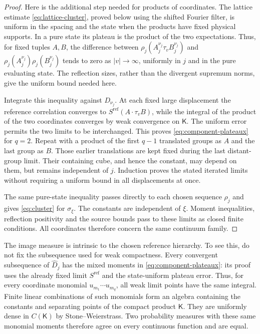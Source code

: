 \documentclass[11pt,letterpaper,reqno]{amsart}
\theoremstyle{definition}
\theoremstyle{remark}
\begin{document}
\begin{proof}
Here is the additional step needed for products of coordinates.
The lattice estimate \eqref{eq:lattice-cluster}, proved below using
the shifted Fourier filter, is uniform in the spacing and the
state when the products have fixed physical supports. In a pure
state its plateau is the product of the two expectations. Thus,
for fixed tuples $A,B$, the difference between
$\rho_j(A_j^{\nu_j}\tau_vB_j^{\nu_j})$ and
$\rho_j(A_j^{\nu_j})\rho_j(B_j^{\nu_j})$ tends to zero as
$|v|\to\infty$, uniformly in $j$ and in the pure evaluating state.
The reflection sizes, rather than the divergent supremum norms,
give the uniform bound needed here.

Integrate this inequality against $D_{\nu_j}$. At each fixed large
displacement the reference correlation converges to
$S^{\mathrm{ref}}(A\cdot\tau_vB)$, while the integral of the product
of the two coordinates converges by weak convergence on $\mathsf K$.
The uniform error permits the two limits to be interchanged. This
proves \eqref{eq:component-plateaux} for $q=2$. Repeat with a product
of the first $q-1$ translated groups as $A$ and the last group as $B$.
Those earlier translations are kept fixed during the last distant-group
limit. Their containing cube, and hence the constant, may depend on
them, but remains independent of $j$. Induction proves the stated
iterated limits without requiring a uniform bound in all displacements
at once.

The same pure-state inequality passes directly to each chosen sequence
$\rho_j$ and gives \eqref{eq:cluster} for $\sigma_\xi$. The constants
are independent of $\xi$. Moment inequalities, reflection positivity
and the source bounds pass to these limits as closed finite conditions.
All coordinates therefore concern the same continuum family.
\end{proof}

The image measure is intrinsic to the chosen reference hierarchy.
To see this, do not fix the subsequence used for weak compactness.
Every convergent subsequence of $\widehat D_j$ has the mixed moments
in \eqref{eq:component-plateaux}: its proof uses the already fixed
limit $S^{\mathrm{ref}}$ and the state-uniform plateau error. Thus,
for every coordinate monomial $u_{m_1}\cdots u_{m_q}$, all weak limit
points have the same integral. Finite linear combinations of such
monomials form an algebra containing the constants and separating
points of the compact product $\mathsf K$. They are uniformly dense
in $C(\mathsf K)$ by Stone--Weierstrass. Two probability measures
with these same monomial moments therefore agree on every continuous
function and are equal.
\end{document}
